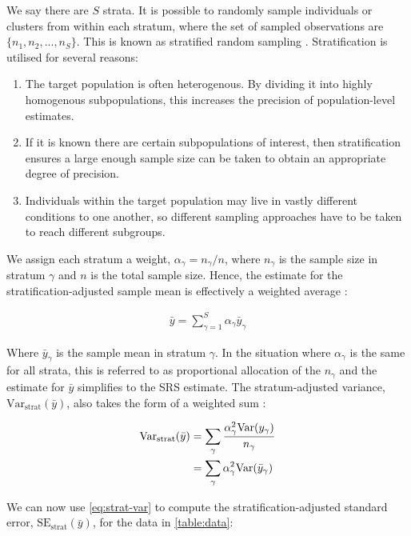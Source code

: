 We say there are $S$ strata. It is possible to randomly sample individuals or clusters from within each stratum, where the set of sampled observations are $\{ n_1, n_2, ..., n_S \}$. This is known as stratified random sampling \citep{cochran1977}. Stratification is utilised for several reasons:

\begin{enumerate}
\item The target population is often heterogenous. By dividing it into highly homogenous subpopulations, this increases the precision of population-level estimates.
\item If it is known there are certain subpopulations of interest, then stratification ensures a large enough sample size can be taken to obtain an appropriate degree of precision.
\item Individuals within the target population may live in vastly different conditions to one another, so different sampling approaches have to be taken to reach different subgroups.
\end{enumerate}

We assign each stratum a weight, $\alpha_{\gamma} = n_{\gamma} / n$, where $n_{\gamma}$ is the sample size in stratum $\gamma$ and $n$ is the total sample size. Hence, the estimate for the stratification-adjusted sample mean is effectively a weighted average \citep{cochran1977}:

\begin{align}
\label{eq:strat-mean}
\bar{y}	=	\sum_{\gamma = 1}^{S} \alpha_{\gamma} \bar{y}_{\gamma}
\end{align}

Where $\bar{y}_{\gamma}$ is the sample mean in stratum $\gamma$. In the situation where $\alpha_{\gamma}$ is the same for all strata, this is referred to as proportional allocation of the $n_{\gamma}$ and the estimate for $\bar{y}$ simplifies to the SRS estimate. The stratum-adjusted variance, $\text{Var}_{\text{strat}}(\bar{y})$, also takes the form of a weighted sum \citep{cochran1977}:

\begin{align}
\label{eq:strat-var}
\text{Var}_{\text{strat}}(\bar{y})	&=	\sum_{\gamma} \frac{ \alpha_{\gamma}^{2} \text{Var}(y_{\gamma}) }{ n_{\gamma} }	\\
\notag
						&=	\sum_{\gamma} \alpha_{\gamma}^{2} \text{Var}(\bar{y}_{\gamma})
\end{align}

We can now use \autoref{eq:strat-var} to compute the stratification-adjusted standard error, $\text{SE}_{\text{strat}}(\bar{y})$, for the data in \autoref{table:data}:

